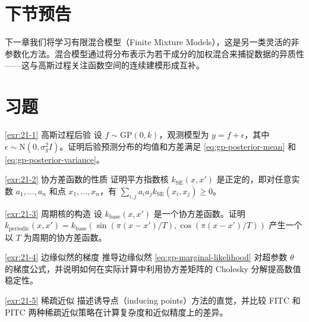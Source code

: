 \section{下节预告}

下一章我们将学习有限混合模型（Finite Mixture Models），这是另一类灵活的非参数化方法。混合模型通过将分布表示为若干成分的加权混合来捕捉数据的异质性——这与高斯过程关注函数空间的连续建模形成互补。

\section{习题}\label{sec:chapter21-exercises}

\begin{Exercise}{\ref{exr:21-1} 高斯过程后验}\label{exr:21-1}
设 $f \sim \mathrm{GP}(0, k)$，观测模型为 $y = f + \epsilon$，其中 $\epsilon \sim \mathrm{N}(0, \sigma_y^2 I)$。证明后验预测分布的均值和方差满足 \cref{eq:gp-posterior-mean} 和 \cref{eq:gp-posterior-variance}。
\end{Exercise}

\begin{Exercise}{\ref{exr:21-2} 协方差函数的性质}\label{exr:21-2}
证明平方指数核 $k_{\mathrm{SE}}(x, x')$ 是正定的，即对任意实数 $a_1, \ldots, a_n$ 和点 $x_1, \ldots, x_n$，有 $\sum_{i,j} a_i a_j k_{\mathrm{SE}}(x_i, x_j) \geq 0$。
\end{Exercise}

\begin{Exercise}{\ref{exr:21-3} 周期核的构造}\label{exr:21-3}
设 $k_{\mathrm{base}}(x, x')$ 是一个协方差函数。证明 $k_{\mathrm{periodic}}(x, x') = k_{\mathrm{base}}(\sin(\pi (x - x') / T), \cos(\pi (x - x') / T))$ 产生一个以 $T$ 为周期的协方差函数。
\end{Exercise}

\begin{Exercise}{\ref{exr:21-4} 边缘似然的梯度}\label{exr:21-4}
推导边缘似然 \cref{eq:gp-marginal-likelihood} 对超参数 $\theta$ 的梯度公式，并说明如何在实际计算中利用协方差矩阵的 Cholesky 分解提高数值稳定性。
\end{Exercise}

\begin{Exercise}{\ref{exr:21-5} 稀疏近似}\label{exr:21-5}
描述诱导点（inducing points）方法的直觉，并比较 FITC 和 PITC 两种稀疏近似策略在计算复杂度和近似精度上的差异。
\end{Exercise}

\endinput
